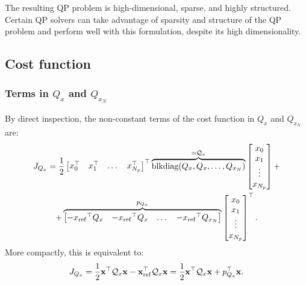 \documentclass[a4paper,12pt,fleqn]{article}
\newcommand{\varxvec}{\mathbf{x}}
\newcommand{\Np}{{N_p}}
\newcommand{\blkdiag}{\text{blkdiag}}
\begin{document}
The resulting QP problem is high-dimensional, sparse, and highly structured. 
Certain QP solvers can take advantage of sparsity and structure of the QP problem and perform well with this formulation, despite its high dimensionality.

\subsection{Cost function}
\subsubsection{Terms in $Q_x$ and $Q_{x_N}$}
By direct inspection, the non-constant terms of the cost function in $Q_x$ and $Q_{x_N}$ are:
\begin{multline}
\label{eq:J_Qx}
 J_{Q_x} = \frac{1}{2}
 \begin{bmatrix}
  x_0^\top & x_1^\top &\dots & x_{\Np}^\top
 \end{bmatrix}^\top
 \overbrace{\blkdiag(Q_x, Q_x, \dots, Q_{x_N})}^{=\mathcal{Q}_x}
 \begin{bmatrix}
  x_0 \\  x_1\\ \vdots\\  x_{\Np}
 \end{bmatrix} + \\
 +
 \overbrace{
  \begin{bmatrix}
  -{x_{\rm ref}}^\top Q_x & -{x_{\rm ref}}^\top Q_x &\dots & -{x_{\rm ref}}^\top Q_{x_N}
 \end{bmatrix} 
 }^{p_{Q_x}}
 \begin{bmatrix}
  x_0 \\ x_1 \\ \vdots \\ x_{\Np}
 \end{bmatrix}^\top.
 \end{multline}
 More compactly, this is equivalent to:
 \begin{equation}
  J_{Q_x} = \frac{1}{2} \varxvec^\top \mathcal{Q}_x \varxvec - \varxvec_{\rm ref}^\top \mathcal{Q}_x \varxvec = \frac{1}{2} \varxvec^\top \mathcal{Q}_x \varxvec + p_{Q_x}^\top \varxvec.
 \end{equation}
\end{document}
